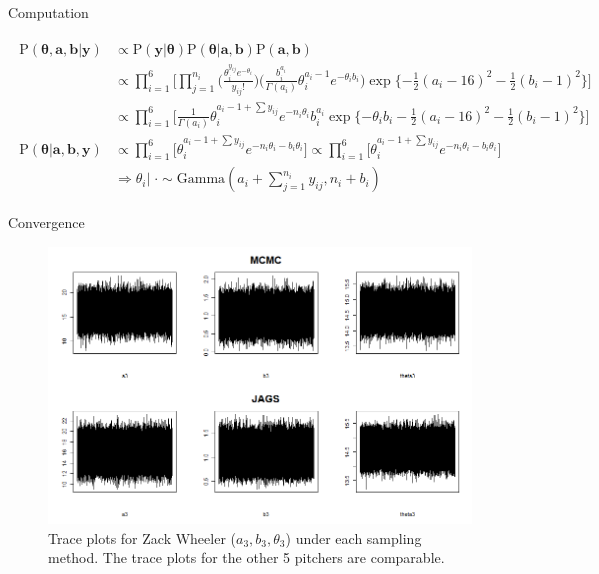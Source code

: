 \documentclass[xcolor=dvipsnames]{beamer}
\begin{document}

\begin{frame}{Computation}

{\footnotesize
\begin{align*}
    \begin{split}
        \text{P}(\boldsymbol{\theta}, \boldsymbol{a}, \boldsymbol{b} | \boldsymbol{y}) &\propto \text{P}(\boldsymbol{y} | \boldsymbol{\theta}) \text{P}(\boldsymbol{\theta}|\boldsymbol{a},\boldsymbol{b})\text{P}(\boldsymbol{a},\boldsymbol{b}) 
        \\
        &\propto \prod_{i=1}^6 \Big[\prod_{j=1}^{n_i} \big( \frac{\theta_i^{y_{ij}}e^{-\theta_i}}{y_{ij}!} \big) \big( \frac{b_i^{a_i}}{\Gamma(a_i)} \theta_i^{a_i-1}e^{-\theta_ib_i} \big) \exp\{-\frac{1}{2}(a_i-16)^2-\frac{1}{2}(b_i-1)^2 \} \Big] 
        \\
        &\propto \prod_{i=1}^6 \Big[ \frac{1}{\Gamma(a_i)} \theta_i^{a_i-1+\sum y_{ij}} e^{-n_i \theta_i} b_i^{a_i} \exp \{ -\theta_i b_i - \frac{1}{2}(a_i-16)^2 - \frac{1}{2}(b_i-1)^2 \} \Big]
        \\
        \text{P}(\boldsymbol{\theta} | \boldsymbol{a}, \boldsymbol{b}, \boldsymbol{y}) &\propto \prod_{i=1}^6 \Big[ \theta_i^{a_i-1+\sum y_{ij}} e^{-n_i \theta_i - b_i \theta_i} \Big] \propto \prod_{i=1}^6 \Big[ \theta_i^{a_i-1+\sum y_{ij}} e^{-n_i \theta_i - b_i \theta_i} \Big]
        \\
        &\Longrightarrow \theta_i | \; \cdot \sim \text{Gamma}(a_i + \sum_{j=1}^{n_i} y_{ij}, n_i+b_i)
        \label{eq:cond-theta}
    \end{split}
\end{align*}
}%

\end{frame}


\begin{frame}{Convergence}

\begin{figure}[h]
    \centering
    \includegraphics[scale=0.4]{figs/trace.png}
    \caption{Trace plots for Zack Wheeler ($a_3, b_3, \theta_3$) under each sampling method. The trace plots for the other 5 pitchers are comparable.}
    \label{fig:trace}
\end{figure}


\end{frame}
\end{document}
